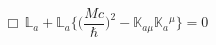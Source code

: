 \begin{equation}
\label{e4:45}
\Box \, {\mathbb{L}}_a +{\mathbb{L}}_a \Big\{ \Big( \frac{Mc}{\hbar} \Big)^2-{\mathbb{K}}_{a \mu}{\mathbb{K}}_a{}^{\mu} \Big\}=0 
\end{equation}

